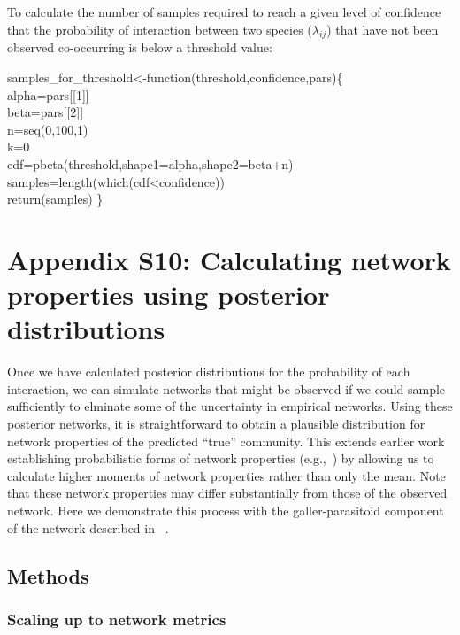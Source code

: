 \documentclass[12pt]{article}
\begin{document}
  To calculate the number of samples required to reach a given level of confidence that the probability of interaction between two species ($\lambda_{ij}$) that have not been observed co-occurring is below a threshold value:


  \vspace{12pt}
  \begin{em}
  \noindent \hspace{2pt}samples\_for\_threshold\textless-function(threshold,confidence,pars)\{\\
    \vspace{4pt}
    alpha=pars[[1]]\\
    beta=pars[[2]]\\
    n=seq(0,100,1)\\
    k=0\\ 
    cdf=pbeta(threshold,shape1=alpha,shape2=beta+n)\\
    samples=length(which(cdf\textless confidence))\\
    return(samples) \}
  \end{em}

\clearpage

\section*{Appendix S10: Calculating network properties using posterior distributions}

  Once we have calculated posterior distributions for the probability of each interaction, we can simulate networks that might be observed if we could sample sufficiently to elminate some of the uncertainty in empirical networks. Using these posterior networks, it is straightforward to obtain a plausible distribution for network properties of the predicted ``true'' community. This extends earlier work establishing probabilistic forms of network properties (e.g.,~\citet{Poisot2015}) by allowing us to calculate higher moments of network properties rather than only the mean. Note that these network properties may differ substantially from those of the observed network. Here we demonstrate this process with the galler-parasitoid component of the network described in ~\citet{Kopelke2017}.

  \subsection*{Methods}

        \subsubsection*{Scaling up to network metrics}
\end{document}
